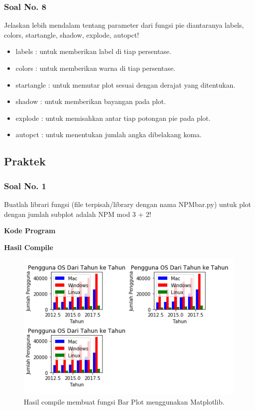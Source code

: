 \subsubsection{Soal No. 8}
\hfill \break
 Jelaskan lebih mendalam tentang parameter dari fungsi pie diantaranya labels, colors, startangle, shadow, explode, autopct!
 
 \begin{itemize}
 	\item labels : untuk memberikan label di tiap persentase.
 	\item colors : untuk memberikan warna di tiap persentase.
 	\item startangle : untuk memutar plot sesuai dengan derajat yang ditentukan.
 	\item shadow : untuk memberikan bayangan pada plot.
 	\item explode : untuk memisahkan antar tiap potongan pie pada plot.
 	\item autopct : untuk menentukan jumlah angka dibelakang koma.
 \end{itemize}

\subsection{Praktek}
\subsubsection{Soal No. 1}
\hfill \break
Buatlah librari fungsi (file terpisah/library dengan nama NPMbar.py) untuk plot dengan jumlah subplot adalah NPM mod 3 + 2!

\hfill \break
\textbf{Kode Program}



\hfill \break
\textbf{Hasil Compile}

\begin{figure}[H]
	\includegraphics[width=12cm]{figures/6/1174034/Teori/p1.png}
	\centering
	\caption{Hasil compile membuat fungsi Bar Plot menggunakan Matplotlib.}
\end{figure}


